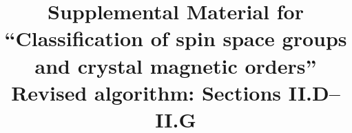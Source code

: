 \documentclass[aps,prl,onecolumn,11pt,notitlepage,nofootinbib]{revtex4-2}
\begin{document}
\title{Supplemental Material for ``Classification of spin space groups
and crystal magnetic orders''\\Revised algorithm: Sections II.D--II.G}
\maketitle

\end{document}
